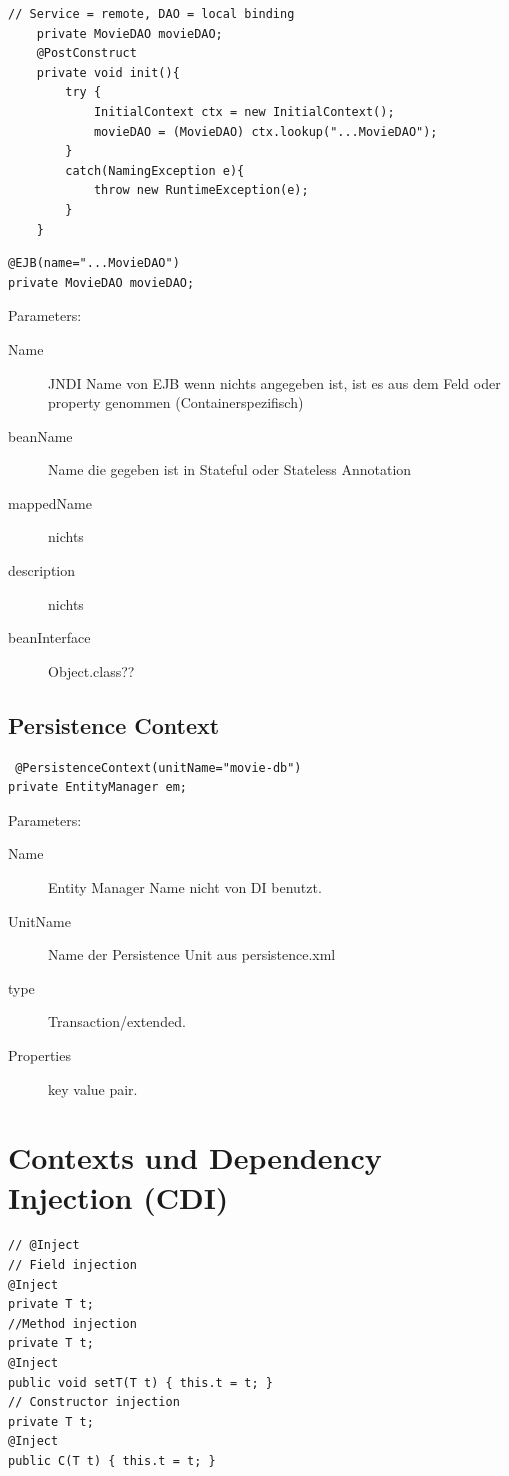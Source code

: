 \documentclass[a4paper,10pt]{scrreprt}
\begin{document}
\begin{lstlisting}[caption=JNDI Lookup DI]
	// Service = remote, DAO = local binding
	private MovieDAO movieDAO;
	@PostConstruct
	private void init(){
		try {
			InitialContext ctx = new InitialContext();
			movieDAO = (MovieDAO) ctx.lookup("...MovieDAO");
		}
		catch(NamingException e){
			throw new RuntimeException(e);
		}
	}
\end{lstlisting}

\begin{lstlisting}[caption=Dependency Injection with Annotation]
 @EJB(name="...MovieDAO")
private MovieDAO movieDAO;
\end{lstlisting}
Parameters: 
\begin{description}
 \item [Name] JNDI Name von EJB wenn nichts angegeben ist, ist es aus dem Feld oder property genommen 
(Containerspezifisch)
\item[beanName] Name die gegeben ist in Stateful oder Stateless Annotation
\item[mappedName] nichts
\item [description] nichts
\item [beanInterface] Object.class??
\end{description}

\subsection{Persistence Context}
\begin{lstlisting}
 @PersistenceContext(unitName="movie-db")
private EntityManager em;
\end{lstlisting}
Parameters:
\begin{description}
 \item [Name] Entity Manager Name nicht von DI benutzt.
 \item [UnitName] Name der Persistence Unit aus persistence.xml
 \item [type] Transaction/extended.
 \item [Properties] key value pair.
\end{description}

\section{Contexts und Dependency Injection (CDI)}

\begin{lstlisting}
// @Inject
// Field injection
@Inject
private T t;
//Method injection
private T t;
@Inject
public void setT(T t) { this.t = t; }
// Constructor injection
private T t;
@Inject
public C(T t) { this.t = t; }
\end{lstlisting}
\end{document}
